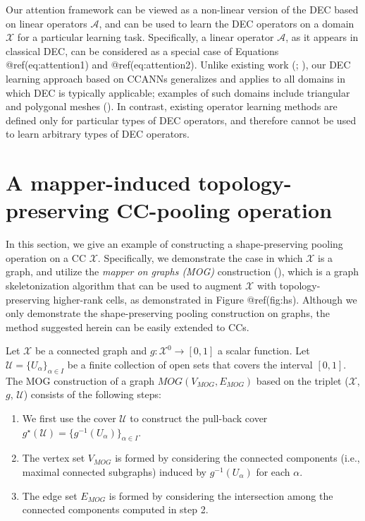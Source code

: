 \documentclass[
  12pt,
]{krantz}
\providecommand{\tightlist}{%
  \setlength{\itemsep}{0pt}\setlength{\parskip}{0pt}}
\begin{document}
Our attention framework can be viewed as a non-linear version of the DEC
based on linear operators \(\mathcal{A}\), and can be used to learn the
DEC operators on a domain \(\mathcal{X}\) for a particular learning
task. Specifically, a linear operator \(\mathcal{A}\), as it appears in
classical DEC, can be considered as a special case of Equations
@ref(eq:attention1) and @ref(eq:attention2). Unlike existing work
(;
), our DEC
learning approach based on CCANNs generalizes and applies to all domains
in which DEC is typically applicable; examples of such domains include
triangular and polygonal meshes (). In contrast, existing operator learning methods are
defined only for particular types of DEC operators, and therefore cannot
be used to learn arbitrary types of DEC operators.

\section{A mapper-induced topology-preserving CC-pooling
operation}\label{a-mapper-induced-topology-preserving-cc-pooling-operation}

In this section, we give an example of constructing a shape-preserving
pooling operation on a CC \(\mathcal{X}\). Specifically, we demonstrate
the case in which \(\mathcal{X}\) is a graph, and utilize the
\emph{mapper on graphs (MOG)} construction
(), which is a
graph skeletonization algorithm that can be used to augment
\(\mathcal{X}\) with topology-preserving higher-rank cells, as
demonstrated in Figure @ref(fig:hs). Although we only demonstrate the
shape-preserving pooling construction on graphs, the method suggested
herein can be easily extended to CCs.

Let \(\mathcal{X}\) be a connected graph and
\(g\colon\mathcal{X}^{0} \to [0,1]\) a scalar function. Let
\(\mathcal{U}=\{U_\alpha\}_{\alpha \in I}\) be a finite collection of
open sets that covers the interval \([0,1]\). The MOG construction of a
graph \(MOG(V_{MOG},E_{MOG})\) based on the triplet (\(\mathcal{X}\),
\(g\), \(\mathcal{U}\)) consists of the following steps:

\begin{enumerate}
\def\labelenumi{\arabic{enumi}.}
\tightlist
\item
  We first use the cover \(\mathcal{U}\) to construct the pull-back
  cover
  \(g^{\star}(\mathcal{U})=\{g^{-1}(U_{\alpha})\}_{\alpha \in I}\).
\item
  The vertex set \(V_{MOG}\) is formed by considering the connected
  components (i.e., maximal connected subgraphs) induced by
  \(g^{-1}(U_\alpha)\) for each \(\alpha\).
\item
  The edge set \(E_{MOG}\) is formed by considering the intersection
  among the connected components computed in step 2.
\end{enumerate}
\end{document}
